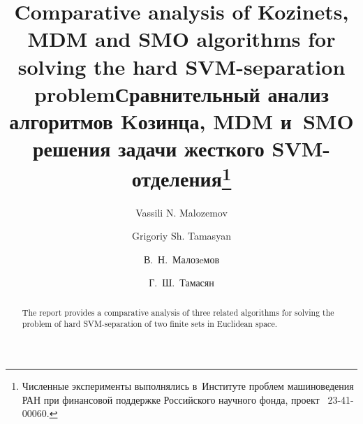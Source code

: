 \begin{englishtitle} %
\title{Comparative analysis of Kozinets, MDM and SMO algorithms for solving the hard SVM-separation problem}
\author{Vassili N. Malozemov \and  Grigoriy Sh. Tamasyan
}

\maketitle

\begin{abstract}
The report provides a comparative analysis of three related algorithms for solving the problem of hard SVM-separation of two finite sets in Euclidean space.

\end{abstract}
\end{englishtitle}

\iffalse
\documentclass[12pt]{llncs}  


\usepackage{iftex}

\ifPDFTeX
\usepackage[T2A]{fontenc}
\usepackage[utf8]{inputenc} %
\usepackage[english,russian]{babel}
\fi

\usepackage{todonotes} 

\usepackage[russian]{nla}


\fi
%

\title{Сравнительный анализ алгоритмов Kозинца, MDM и~SMO решения задачи жесткого SVM-отделения\thanks{Численные эксперименты выполнялись в~Институте проблем машиноведения РАН при финансовой поддержке Российского научного фонда, проект \textnumero~23-41-00060.}}
\author{В.~Н.~Малозeмов  
  \and
  Г.~Ш.~Тамасян
} %

